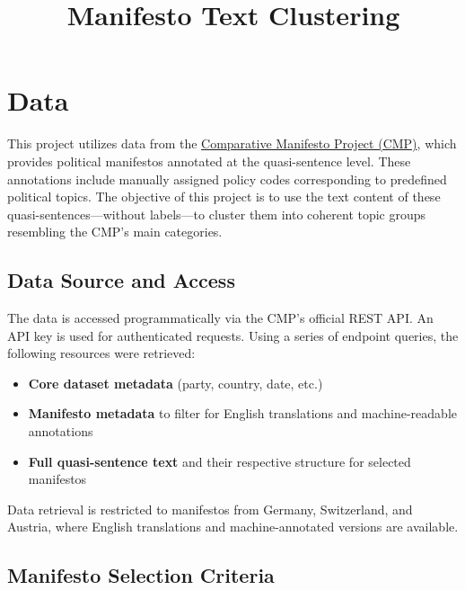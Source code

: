 \documentclass[
  letterpaper,
  DIV=11,
  numbers=noendperiod]{scrartcl}
\title{Manifesto Text Clustering}
\author{}
\date{}
\providecommand{\tightlist}{%
  \setlength{\itemsep}{0pt}\setlength{\parskip}{0pt}}
\renewcommand*\contentsname{Table of contents}
\newcommand\contentsname{Table of contents}
\begin{document}
\maketitle

\renewcommand*\contentsname{Table of contents}
{
\hypersetup{linkcolor=}
\setcounter{tocdepth}{3}
\tableofcontents
}

\section{Data}\label{data}

This project utilizes data from the
\href{https://manifesto-project.wzb.eu/}{Comparative Manifesto Project
(CMP)}, which provides political manifestos annotated at the
quasi-sentence level. These annotations include manually assigned policy
codes corresponding to predefined political topics. The objective of
this project is to use the text content of these
quasi-sentences---without labels---to cluster them into coherent topic
groups resembling the CMP's main categories.

\subsection{Data Source and Access}\label{data-source-and-access}

The data is accessed programmatically via the CMP's official REST API.
An API key is used for authenticated requests. Using a series of
endpoint queries, the following resources were retrieved:

\begin{itemize}
\tightlist
\item
  \textbf{Core dataset metadata} (party, country, date, etc.)
\item
  \textbf{Manifesto metadata} to filter for English translations and
  machine-readable annotations
\item
  \textbf{Full quasi-sentence text} and their respective structure for
  selected manifestos
\end{itemize}

Data retrieval is restricted to manifestos from Germany, Switzerland,
and Austria, where English translations and machine-annotated versions
are available.

\subsection{Manifesto Selection
Criteria}\label{manifesto-selection-criteria}
\end{document}
